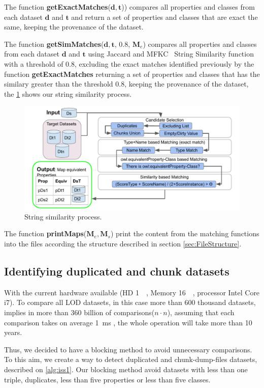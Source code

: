 \documentclass[sw]{iosart2x}
\begin{document}
The function \textbf{getExactMatches}($\mathbf{d},\mathbf{t}$)) compares all properties and classes from each dataset $\mathbf{d}$ and $\mathbf{t}$ and return a set of properties and classes that are exact the same, keeping the provenance of the dataset.

The function \textbf{getSimMatches}($\mathbf{d},\mathbf{t}$, 0.8, $\mathbf{M}_e$) compares all properties and classes from each dataset $\mathbf{d}$ and $\mathbf{t}$ using Jaccard and MFKC~\cite{valdestilhas2017high} String Similarity function with a threshold of 0.8, excluding the exact matches identified previously by the function \textbf{getExactMatches} returning a set of properties and classes that has the similary greater than the threshold 0.8, keeping the provenance of the dataset, the \cref{fig:simMatch} shows our string similarity process.
\begin{figure}[htb] 
	\centering
	\includegraphics[width=0.8\linewidth]{img/stringSim.pdf}
	\caption{String similarity process.}
	\label{fig:simMatch}
\end{figure}

The function \textbf{printMaps}($\mathbf{M}_e, \mathbf{M}_s$) print the content from the matching functions into the files according the structure described in section \ref{sec:FileStructure}.

\subsection{Identifying duplicated and chunk datasets}
\label{sec:duplicates}
With the current hardware available (HD \SI{1}{\tebi\byte}, Memory \SI{16}{\gibi\byte}, processor Intel Core i7).
To compare all LOD datasets, in this case more than 600 thousand datasets, implies in more than 360 billion of comparisons($n \cdot n$), assuming that each comparison takes on average \SI{1}{\milli\second} , the whole operation will take more than 10 years.

Thus, we decided to have a blocking method to avoid unnecessary comparisons.
To this aim, we create a way to detect duplicated and chunk-dump-files datasets, described on \cref{alg:iss1}. 
Our blocking method avoid datasets with less than one triple, duplicates, less than five properties or less than five classes.
\end{document}
